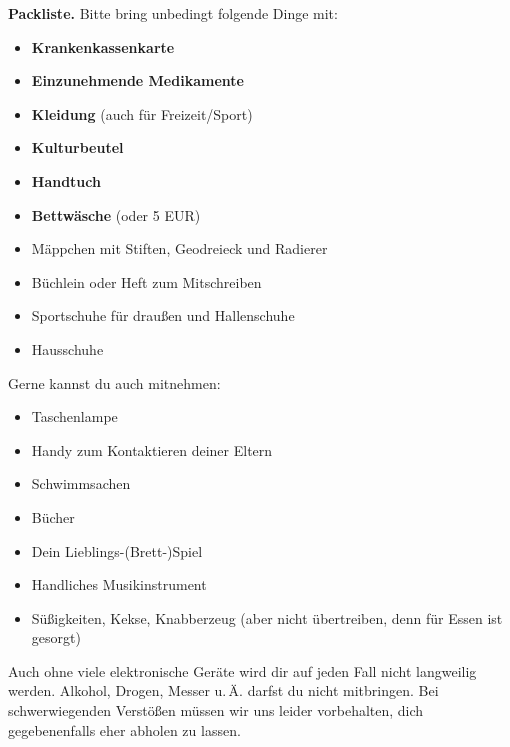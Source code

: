 \documentclass[12pt]{zettel}
\begin{document}
\begin{shaded}
\textbf{Packliste.} Bitte bring unbedingt folgende Dinge mit:
\begin{itemize}
\item \textbf{Krankenkassenkarte}
\item \textbf{Einzunehmende Medikamente}
\item \textbf{Kleidung} (auch für Freizeit/Sport)
\item \textbf{Kulturbeutel}
\item \textbf{Handtuch}
\item \textbf{Bettwäsche} (oder 5 EUR)
\item Mäppchen mit Stiften, Geodreieck und Radierer %
\item Büchlein oder Heft zum Mitschreiben
\item Sportschuhe für draußen und Hallenschuhe
\item Hausschuhe
\end{itemize}
Gerne kannst du auch mitnehmen:
\begin{itemize}
\item Taschenlampe
\item Handy zum Kontaktieren deiner Eltern
\item Schwimmsachen
\item Bücher
\item Dein Lieblings-(Brett-)Spiel
\item Handliches Musikinstrument
\item Süßigkeiten, Kekse, Knabberzeug (aber nicht übertreiben, denn für Essen
ist gesorgt)
\end{itemize}
Auch ohne viele elektronische Geräte wird dir auf jeden Fall nicht langweilig werden.
Alkohol, Drogen, Messer u.\,Ä. darfst du nicht mitbringen. Bei schwerwiegenden Verstößen müssen wir uns leider vorbehalten, dich gegebenenfalls eher abholen zu lassen.
\end{shaded}

\vfill
\end{document}

